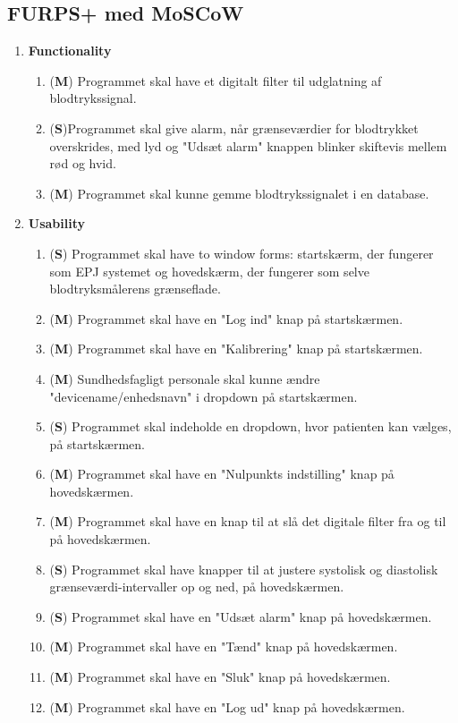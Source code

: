 \subsection{FURPS+ med MoSCoW}
\begin{enumerate}
\item \textbf{Functionality}
\begin{enumerate}
\item (\textbf{M}) Programmet skal have et digitalt filter til udglatning af blodtrykssignal.
\item (\textbf{S})Programmet skal give alarm, når grænseværdier for blodtrykket overskrides, med lyd og "Udsæt alarm" knappen blinker skiftevis mellem rød og hvid.
\item (\textbf{M}) Programmet skal kunne gemme blodtrykssignalet i en database.
\end{enumerate}
\item \textbf{Usability}
\begin{enumerate}
\item (\textbf{S}) Programmet skal have to window forms: startskærm, der fungerer som  EPJ systemet og hovedskærm, der fungerer som selve blodtryksmålerens grænseflade.
\item (\textbf{M}) Programmet skal have en "Log ind" knap på startskærmen.
\item (\textbf{M}) Programmet skal have en "Kalibrering" knap på startskærmen.
\item (\textbf{M}) Sundhedsfagligt personale skal kunne ændre "devicename/enhedsnavn" i dropdown på startskærmen.
\item (\textbf{S}) Programmet skal indeholde en dropdown, hvor patienten kan vælges, på startskærmen.
\item (\textbf{M}) Programmet skal have en "Nulpunkts indstilling" knap på hovedskærmen.
\item (\textbf{M}) Programmet skal have en knap til at slå det digitale filter fra og til på hovedskærmen.
\item (\textbf{S}) Programmet skal have knapper til at justere systolisk og diastolisk grænseværdi-intervaller op og ned, på hovedskærmen.
\item (\textbf{S}) Programmet skal have en "Udsæt alarm" knap på hovedskærmen.
\item (\textbf{M}) Programmet skal have en "Tænd" knap på hovedskærmen.
\item (\textbf{M}) Programmet skal have en "Sluk" knap på hovedskærmen.
\item (\textbf{M}) Programmet skal have en "Log ud" knap på hovedskærmen.

\end{enumerate}
\end{enumerate}
